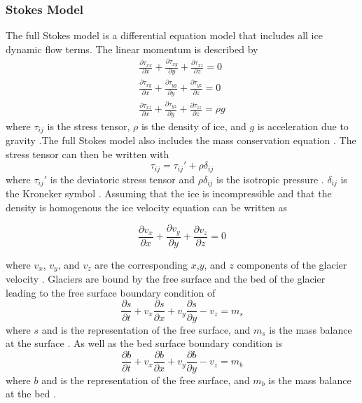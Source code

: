 \documentclass{article}
\begin{document}
\subsubsection{Stokes Model}
The full Stokes model is a differential equation model that includes all ice dynamic flow terms. The linear momentum is described by
\begin{subequations}\label{Stokes}
\begin{gather}
    \frac{\partial \tau_{xx}}{\partial x} + \frac{\partial \tau_{xy}}{\partial y}+ \frac{\partial \tau_{xz}}{\partial z} = 0\\
    \frac{\partial \tau_{xy}}{\partial x} + \frac{\partial \tau_{yy}}{\partial y}+ \frac{\partial \tau_{yz}}{\partial z} = 0\\
    \frac{\partial \tau_{xz}}{\partial x} + \frac{\partial \tau_{yz}}{\partial y}+ \frac{\partial \tau_{zz}}{\partial z} = \rho g
\end{gather}
\end{subequations}
where $\tau_{ij}$ is the stress tensor, $\rho$ is the density of ice, and $g$ is acceleration due to gravity \citep{LEMEUR2004}.The full Stokes model also includes the mass conservation equation \citep{LEMEUR2004}. The stress tensor can then be written with
\begin{equation}
    \tau_{ij} = \tau_{ij}' + \rho \delta_{ij}
\end{equation}
where $\tau_{ij}'$ is the deviatoric stress tensor and $\rho\delta_{ij}$ is the isotropic pressure \citep{LEMEUR2004, soucek2008}. $\delta_{ij}$ is the Kroneker symbol \cite{LEMEUR2004}. Assuming that the ice is incompressible and that the density is homogenous the ice velocity equation can be written as

\begin{equation} \label{mass conservation}
\frac{\partial v_x}{\partial x} + \frac{\partial v_y}{\partial y}  +\frac{\partial v_z}{\partial z} =0   
\end{equation}

where $v_x$, $v_y$, and $v_z$ are the corresponding $x$,$y$, and $z$ components of the glacier velocity \citep{LEMEUR2004,soucek2008}. Glaciers are bound by the free surface and the bed of the glacier leading to the free surface boundary condition of 
\begin{equation}\label{free surface}
\frac{\partial s}{\partial t} + v_x \frac{\partial s}{\partial x}+ v_y \frac{\partial s}{\partial y} -v_z = m_s
\end{equation}
where $s$ and is the representation of the free surface, and $m_s$ is the mass balance at the surface \citep{LEMEUR2004, Greve2009}. As well as the bed surface boundary condition is
\begin{equation}\label{bed}
\frac{\partial b}{\partial t} + v_x \frac{\partial b}{\partial x}+ v_y \frac{\partial b}{\partial y} -v_z = m_b
\end{equation}
where $b$ and is the representation of the free surface, and $m_b$ is the mass balance at the bed \citep{LEMEUR2004, Greve2009}.
\end{document}

